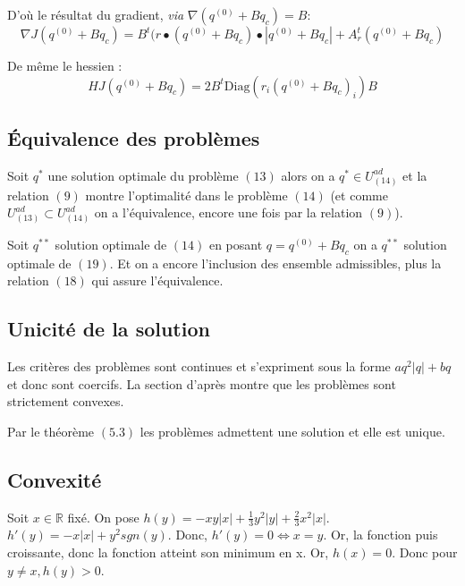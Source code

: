 \documentclass[11pt]{article}
\begin{document}
D'où le résultat du gradient, \emph{via} $\nabla(q^{(0)} + B q_c) = B$:
$$ \boxed{ \nabla J (q^{(0)} + B q_c) = B^t(r \bullet (q^{(0)} + B q_c) \bullet | q^{(0)} + B q_c | + A_r^t(q^{(0)} + B q_c) } $$

De même le hessien :
$$  \boxed{ H J (q^{(0)} + B q_c) = 2 B^t \text{Diag}(r_i (q^{(0)} + B q_c)_i) B } $$

\subsection*{Équivalence des problèmes}

Soit $q^*$ une solution optimale du problème $(13)$ alors on a $q^* \in U^{ad}_{(14)}$ et la relation $(9)$ montre l'optimalité dans le problème $(14)$ (et comme $U_{(13)}^{ad} \subset U_{(14)}^{ad}$ on a l'équivalence, encore une fois par la relation $(9)$).

\noindent Soit $q^{**}$ solution optimale de $(14)$ en posant $q = q^{(0)} + B q_c$ on a $q^{**}$ solution optimale de $(19)$. Et on a encore l’inclusion des ensemble admissibles, plus la relation $(18)$ qui assure l'équivalence.

\subsection*{Unicité de la solution}

Les critères des problèmes sont continues et s'expriment sous la forme $a q^2|q| + b q$ et donc sont coercifs. La section d'après montre que les problèmes sont strictement convexes.

Par le théorème $(5.3)$ les problèmes admettent une solution et elle est unique.

\subsection*{Convexité}
Soit $x\in \mathbb{R}$ fixé. On pose $h(y) = -x y |x| + \frac{1}{3} y^2 |y| + \frac{2}{3} x^2 |x|$.
 $h'(y) = -x |x| + y^2 sgn(y)$. Donc, $h'(y) = 0 \Leftrightarrow x = y$. Or, la fonction puis croissante, donc la fonction atteint son minimum en x. Or, $h(x) = 0$. Donc pour $y \neq x, h(y) > 0
$. \\
\end{document}
